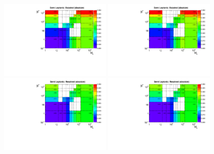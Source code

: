 \begin{figure}[htbp]
  \centering
  \includegraphics[width=0.48\textwidth]{figures/ttDM_S_semilep_2D_R15_boosted.pdf}
  \includegraphics[width=0.48\textwidth]{figures/ttDM_PS_semilep_2D_R15_boosted.pdf} \\
  \includegraphics[width=0.48\textwidth]{figures/ttDM_S_semilep_2D_R15_resolved.pdf}
  \includegraphics[width=0.48\textwidth]{figures/ttDM_PS_semilep_2D_R15_resolved.pdf}
  \caption{}
  \label{fig:semilept_acc15}
\end{figure}
